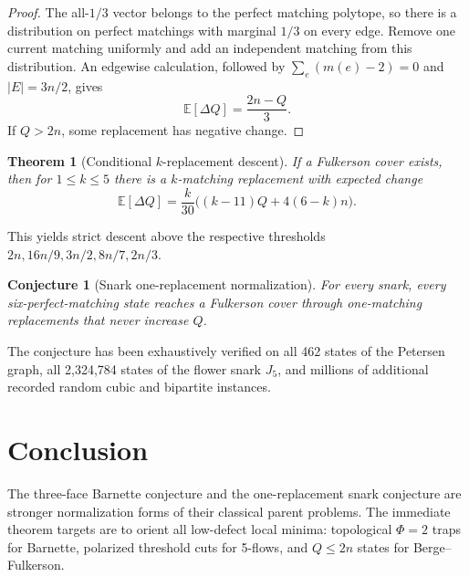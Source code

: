 \documentclass[11pt]{article}
\newtheorem{theorem}{Theorem}
\newtheorem{conjecture}{Conjecture}
\begin{document}
\begin{proof}
The all-$1/3$ vector belongs to the perfect matching polytope, so there is
a distribution on perfect matchings with marginal $1/3$ on every edge.
Remove one current matching uniformly and add an independent matching from
this distribution.  An edgewise calculation, followed by
$\sum_e(m(e)-2)=0$ and $|E|=3n/2$, gives
\[
 \mathbb E[\Delta Q]=\frac{2n-Q}{3}.
\]
If $Q>2n$, some replacement has negative change.
\end{proof}

\begin{theorem}[Conditional $k$-replacement descent]
If a Fulkerson cover exists, then for $1\le k\le5$ there is a
$k$-matching replacement with expected change
\[
 \mathbb E[\Delta Q]
 =\frac{k}{30}\bigl((k-11)Q+4(6-k)n\bigr).
\]
\end{theorem}

This yields strict descent above the respective thresholds
$2n,16n/9,3n/2,8n/7,2n/3$.

\begin{conjecture}[Snark one-replacement normalization]
For every snark, every six-perfect-matching state reaches a Fulkerson
cover through one-matching replacements that never increase $Q$.
\end{conjecture}

The conjecture has been exhaustively verified on all 462 states of the
Petersen graph, all 2,324,784 states of the flower snark $J_5$, and
millions of additional recorded random cubic and bipartite instances.

\section{Conclusion}
The three-face Barnette conjecture and the one-replacement snark
conjecture are stronger normalization forms of their classical parent
problems.  The immediate theorem targets are to orient all low-defect
local minima: topological $\Phi=2$ traps for Barnette, polarized threshold
cuts for 5-flows, and $Q\le2n$ states for Berge--Fulkerson.
\end{document}
